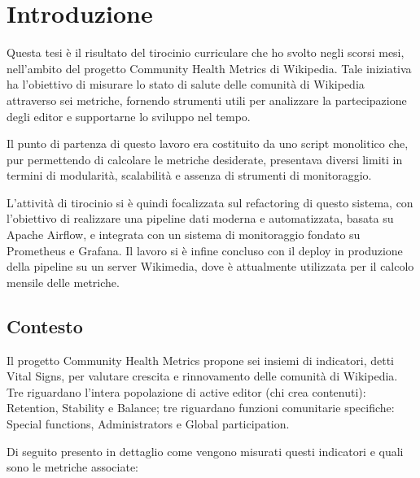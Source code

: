 \chapter{Introduzione}
\label{cha:intro}


Questa tesi è il risultato del tirocinio curriculare che ho svolto negli scorsi mesi, nell'ambito del progetto Community Health Metrics di Wikipedia.
Tale iniziativa ha l’obiettivo di misurare lo stato di salute delle comunità di Wikipedia attraverso sei metriche,
fornendo strumenti utili per analizzare la partecipazione degli editor e supportarne lo sviluppo nel tempo.

Il punto di partenza di questo lavoro era costituito da uno script monolitico che,
pur permettendo di calcolare le metriche desiderate, presentava diversi limiti in termini di modularità,
scalabilità e assenza di strumenti di monitoraggio.

L’attività di tirocinio si è quindi focalizzata sul refactoring di questo sistema,
con l’obiettivo di realizzare una pipeline dati moderna e automatizzata, basata su Apache Airflow, e integrata con un sistema di monitoraggio fondato su Prometheus e Grafana.
Il lavoro si è infine concluso con il deploy in produzione della pipeline su un server Wikimedia,
dove è attualmente utilizzata per il calcolo mensile delle metriche.

\section{Contesto}
\label{sec:contesto}
Il progetto Community Health Metrics propone sei insiemi di indicatori, detti Vital Signs, per valutare crescita e rinnovamento delle comunità di Wikipedia.
Tre riguardano l’intera popolazione di active editor (chi crea contenuti):
Retention, Stability e Balance;
tre riguardano funzioni comunitarie specifiche: Special functions, Administrators e Global participation.

Di seguito presento in dettaglio come vengono misurati questi indicatori e quali sono le metriche associate:

